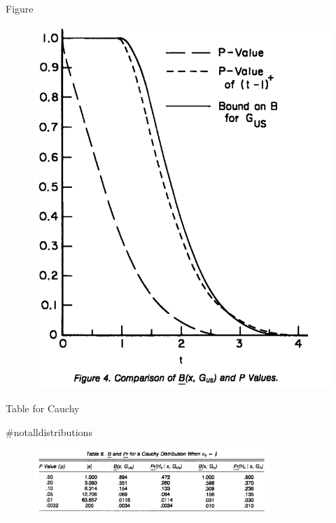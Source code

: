 \begin{frame}{Figure}

\begin{figure}[t]
\includegraphics[height=0.8\textheight]{figures/figure4}
\centering
\end{figure}

\end{frame}


\begin{frame}{Table for Cauchy}

\#notalldistributions

\begin{figure}[t]
\includegraphics[width=0.8\textwidth]{figures/table8}
\centering
\end{figure}

\end{frame}



